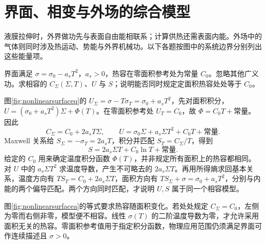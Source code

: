 \section{界面、相变与外场的综合模型}
液膜拉伸时，外界做功先与表面自由能相联系；计算供热还需表面内能。外场中的气体则同时涉及热运动、势能与外界机械功。以下各题按图中的系统边界分别列出这些能量项。

\begin{example}[非线性表面张力与相容热容]
界面满足 $\sigma=\sigma_0-a_sT^2$，$a_s>0$，热容在零面积参考处为常量 $C_0$。忽略其他广义功。求相容的 $C_\Sigma(\Sigma,T)$、$U$ 与 $S$；说明能否同时规定定面积热容处处等于 $C_0$。
\end{example}
\begin{solution}
图\ref{fig:nonlinearsurfaceq}的 $U_\Sigma=\sigma-T\sigma_T=\sigma_0+a_sT^2$，先对面积积分，$U=(\sigma_0+a_sT^2)\Sigma+\Phi(T)$。在零面积参考处 $U_T=C_0$，故 $\Phi=C_0T+\text{常量}$。因此
\[
 C_\Sigma=C_0+2a_sT\Sigma,
 \qquad U=\sigma_0\Sigma+a_s\Sigma T^2+C_0T+\text{常量}.
\]
Maxwell 关系给 $S_\Sigma=-\sigma_T=2a_sT$，积分并匹配 $S_T=C_\Sigma/T$，得到
\[
 S=2a_s\Sigma T+C_0\ln T+\text{常量}.
\]
给定的 $C_0$ 用来确定温度积分函数 $\Phi(T)$，并非规定所有面积上的热容都相同。对 $U$ 中的 $a_s\Sigma T^2$ 求温度导数，产生不可略去的 $2a_s\Sigma T$。再用所得熵求回基本关系，温度方向有 $T S_T=C_0+2a_s\Sigma T$，面积方向有 $T S_\Sigma+\sigma=\sigma_0+a_sT^2$，分别与内能的两个偏导匹配。两个方向同时匹配，才说明 $U,S$ 属于同一个相容模型。

图\ref{fig:nonlinearsurfacea}的等式要求热容随面积变化。若处处规定 $C_\Sigma=C_0$，左侧为零而右侧非零，模型便不相容。线性 $\sigma(T)$ 的二阶温度导数为零，才允许采用面积无关的热容。零面积参考值用于指定积分函数，物理应用范围仍须满足界面可作连续描述且 $\sigma>0$。
\end{solution}

